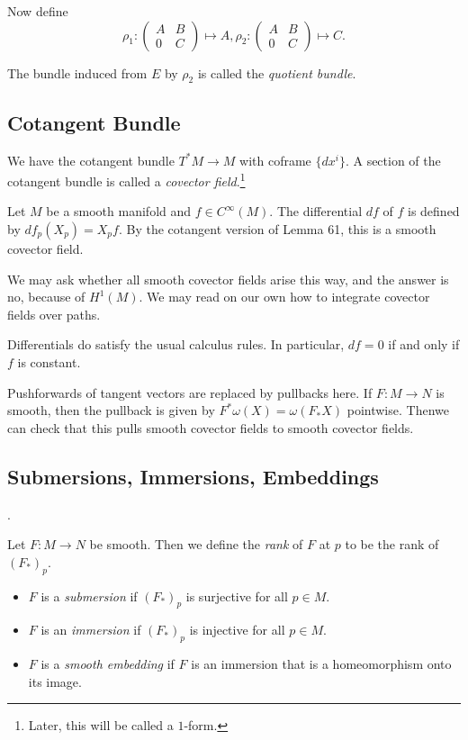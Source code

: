 \documentclass[twoside, 10pt]{article}
\begin{document}
    Now define \[\rho_1: \begin{pmatrix} A & B \\ 0 & C \end{pmatrix} \mapsto
    A, \rho_2: \begin{pmatrix} A & B \\0 & C \end{pmatrix} \mapsto C.\]

    \begin{defn} The bundle induced from $E$ by $\rho_2$ is called the
    \textit{quotient bundle}.  \end{defn}

    \subsection{Cotangent Bundle}%
    
    We have the cotangent bundle $T^*M \to M$ with coframe $\{dx^i\}$. A
    section of the cotangent bundle is called a \textit{covector
    field}.\footnote{Later, this will be called a $1$-form.}
    
    \begin{exm} Let $M$ be a smooth manifold and $f \in C^{\infty}(M)$. The
    differential $df$ of $f$ is defined by $df_p(X_p) = X_p f$. By the
cotangent version of Lemma 61, this is a smooth covector field.  \end{exm}

    We may ask whether all smooth covector fields arise this way, and the
    answer is no, because of $H^1(M)$. We may read on our own how to integrate
    covector fields over paths.

    Differentials do satisfy the usual calculus rules. In particular, $df = 0$
    if and only if $f$ is constant.

    Pushforwards of tangent vectors are replaced by pullbacks here. If $F:M \to
    N$ is smooth, then the pullback is given by $F^*\omega(X) = \omega(F_*X)$
    pointwise. Thenwe can check that this pulls smooth covector fields to
    smooth covector fields.

    \subsection{Submersions, Immersions, Embeddings}.
    \label{sub:submersions_immersions_embeddings}

    \begin{defn} Let $F:M \to N$ be smooth. Then we define the \textit{rank} of
        $F$ at $p$ to be the rank of $(F_*)_p$.  \begin{itemize} \item $F$ is a
            \textit{submersion} if $(F_*)_p$ is surjective for all $p \in M$.
        \item $F$ is an \textit{immersion} if $(F_*)_p$ is injective for all $p
            \in M$.  \item $F$ is a \textit{smooth embedding} if $F$ is an
    immersion that is a homeomorphism onto its image.  \end{itemize}
\end{defn}%
\end{document}
